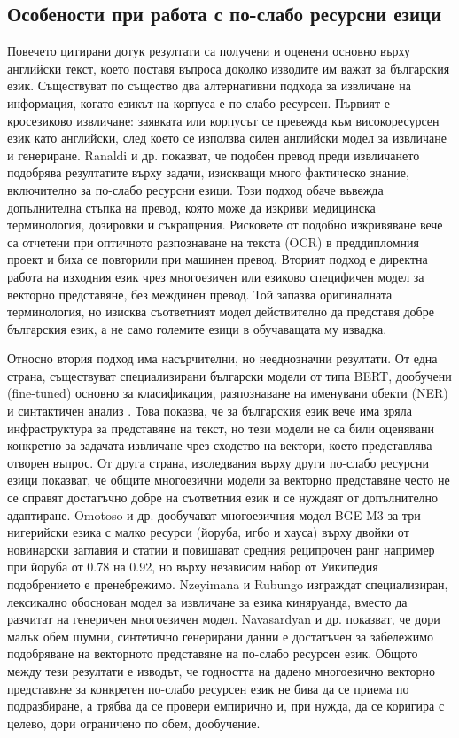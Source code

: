 \documentclass[12pt,a4paper]{article}
\begin{document}
\subsection{Особености при работа с по-слабо ресурсни езици}
Повечето цитирани дотук резултати са получени и оценени основно върху английски текст, което поставя въпроса доколко изводите им важат за българския език. Съществуват по същество два алтернативни подхода за извличане на информация, когато езикът на корпуса е по-слабо ресурсен. Първият е кросезиково извличане: заявката или корпусът се превежда към високоресурсен език като английски, след което се използва силен английски модел за извличане и генериране. Ranaldi и др. \cite{ranaldi2025crossrag} показват, че подобен превод преди извличането подобрява резултатите върху задачи, изискващи много фактическо знание, включително за по-слабо ресурсни езици. Този подход обаче въвежда допълнителна стъпка на превод, която може да изкриви медицинска терминология, дозировки и съкращения. Рисковете от подобно изкривяване вече са отчетени при оптичното разпознаване на текста (OCR) в преддипломния проект и биха се повторили при машинен превод. Вторият подход е директна работа на изходния език чрез многоезичен или езиково специфичен модел за векторно представяне, без междинен превод. Той запазва оригиналната терминология, но изисква съответният модел действително да представя добре българския език, а не само големите езици в обучаващата му извадка.

Относно втория подход има насърчителни, но нееднозначни резултати. От една страна, съществуват специализирани български модели от типа BERT, дообучени (fine-tuned) основно за класификация, разпознаване на именувани обекти (NER) и синтактичен анализ \cite{marinova2023bulgariantransformers, paev2024bulgarianparsing}. Това показва, че за българския език вече има зряла инфраструктура за представяне на текст, но тези модели не са били оценявани конкретно за задачата извличане чрез сходство на вектори, което представлява отворен въпрос. От друга страна, изследвания върху други по-слабо ресурсни езици показват, че общите многоезични модели за векторно представяне често не се справят достатъчно добре на съответния език и се нуждаят от допълнително адаптиране. Omotoso и др. \cite{omotoso2025bgem3} дообучават многоезичния модел BGE-M3 за три нигерийски езика с малко ресурси (йоруба, игбо и хауса) върху двойки от новинарски заглавия и статии и повишават средния реципрочен ранг например при йоруба от 0.78 на 0.92, но върху независим набор от Уикипедия подобрението е пренебрежимо. Nzeyimana и Rubungo \cite{nzeyimana2025kinyacolbert} изграждат специализиран, лексикално обоснован модел за извличане за езика киняруанда, вместо да разчитат на генеричен многоезичен модел. Navasardyan и др. \cite{navasardyan2026embeddings} показват, че дори малък обем шумни, синтетично генерирани данни е достатъчен за забележимо подобряване на векторното представяне на по-слабо ресурсен език. Общото между тези резултати е изводът, че годността на дадено многоезично векторно представяне за конкретен по-слабо ресурсен език не бива да се приема по подразбиране, а трябва да се провери емпирично и, при нужда, да се коригира с целево, дори ограничено по обем, дообучение.
\end{document}
